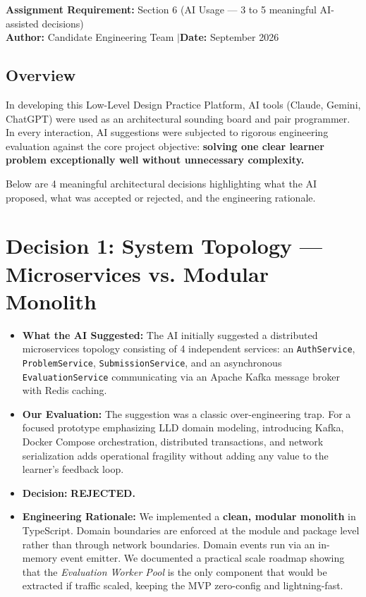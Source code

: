 \documentclass[10pt,a4paper]{article}
\begin{document}
\textbf{Assignment Requirement:} Section 6 (AI Usage --- 3 to 5 meaningful AI-assisted decisions) \\
\textbf{Author:} Candidate Engineering Team \quad$\vert$\quad \textbf{Date:} September 2026

\subsection*{Overview}
In developing this Low-Level Design Practice Platform, AI tools (Claude, Gemini, ChatGPT) were used as an architectural sounding board and pair programmer. In every interaction, AI suggestions were subjected to rigorous engineering evaluation against the core project objective: \textbf{solving one clear learner problem exceptionally well without unnecessary complexity.}

Below are 4 meaningful architectural decisions highlighting what the AI proposed, what was accepted or rejected, and the engineering rationale.

\section*{Decision 1: System Topology --- Microservices vs. Modular Monolith}
\begin{itemize}
  \item \textbf{What the AI Suggested:} The AI initially suggested a distributed microservices topology consisting of 4 independent services: an \texttt{AuthService}, \texttt{ProblemService}, \texttt{SubmissionService}, and an asynchronous \texttt{EvaluationService} communicating via an Apache Kafka message broker with Redis caching.
  \item \textbf{Our Evaluation:} The suggestion was a classic over-engineering trap. For a focused prototype emphasizing LLD domain modeling, introducing Kafka, Docker Compose orchestration, distributed transactions, and network serialization adds operational fragility without adding any value to the learner's feedback loop.
  \item \textbf{Decision:} \textbf{REJECTED.}
  \item \textbf{Engineering Rationale:} We implemented a \textbf{clean, modular monolith} in TypeScript. Domain boundaries are enforced at the module and package level rather than through network boundaries. Domain events run via an in-memory event emitter. We documented a practical scale roadmap showing that the \textit{Evaluation Worker Pool} is the only component that would be extracted if traffic scaled, keeping the MVP zero-config and lightning-fast.
\end{itemize}
\end{document}
